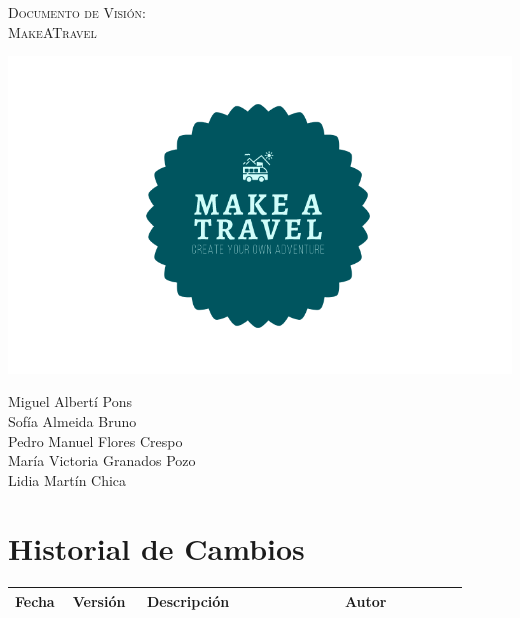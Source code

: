 \documentclass[11pt]{article}
\begin{document}
\begin{titlepage}
\centering
\vspace{4.5cm}
{\scshape\LARGE Documento de Visión:\\MakeATravel \par}
\vspace{1.5cm}

\includegraphics[width=16cm]{Logo}

\vspace{3cm}
{\scshape\large \par}
\vspace{1cm}

{Miguel Albertí Pons\\
Sofía Almeida Bruno\\
Pedro Manuel Flores Crespo\\
María Victoria Granados Pozo\\
Lidia Martín Chica
\par}

\end{titlepage}
\newpage

\section*{Historial de Cambios}
\begin{table}[H]
  \centering
  \begin{tabular}{p{0.1\linewidth}p{0.15\linewidth}p{0.4\linewidth}p{0.25\linewidth}}
    \toprule
    \textbf{Fecha} & \textbf{Versión} & \textbf{Descripción} & \textbf{Autor}\\
    \midrule
    \bottomrule
  \end{tabular}
\end{table}
\newpage
\end{document}
